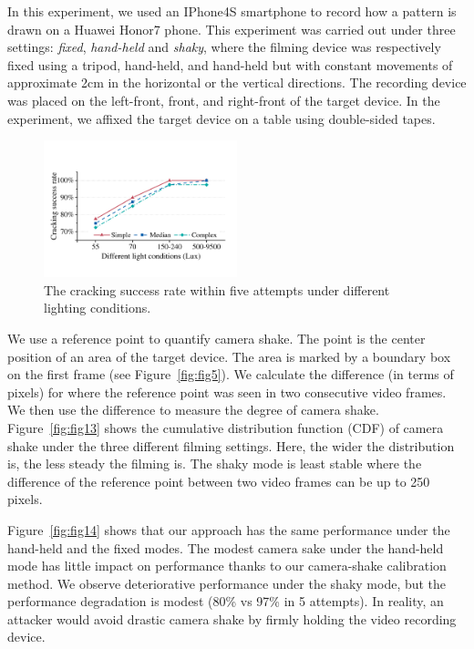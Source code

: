     In this experiment, we used an IPhone4S smartphone to record how a pattern is drawn on a Huawei Honor7 phone. This experiment was carried out under three settings:
    \emph{fixed}, \emph{hand-held} and \emph{shaky}, where the filming
    device was respectively fixed using a tripod, hand-held, and hand-held but with constant movements of
     approximate 2cm in the horizontal or the vertical directions. The recording device was placed on the left-front, front, and right-front of the target device.
    In the experiment, we affixed the target device on a table using double-sided tapes.

        \begin{figure}[t!]
            \centering
            \includegraphics[width=0.5\textwidth]{fig/light.pdf}
            \caption{The cracking success rate within five attempts under different lighting conditions.}
            \label{fig:light}
        \end{figure}

    We use a reference point to quantify camera shake. The point
    is the center position of an area of the target device. The area is marked by a boundary box on the first
    frame (see Figure~\ref{fig:fig5}). We calculate the difference (in terms of pixels) for where the
    reference point was seen in two consecutive video frames. We then use the difference to measure the degree of camera shake.
    Figure~\ref{fig:fig13} shows the cumulative distribution function (CDF)
    of camera shake under the three different filming settings.
    Here, the wider the distribution is, the less steady the
     filming is. The shaky mode is least stable where the difference of the reference point between two video frames can be up to 250 pixels.


    Figure~\ref{fig:fig14} shows that our approach has the same performance under
    the hand-held and the fixed modes. The modest camera sake under the hand-held mode
    has little impact on performance thanks to our camera-shake calibration method. We observe deteriorative performance
    under the shaky mode, but the performance degradation is modest (80\% vs 97\%
    in 5 attempts). In reality, an attacker would avoid drastic
    camera shake by firmly holding the video recording device.

